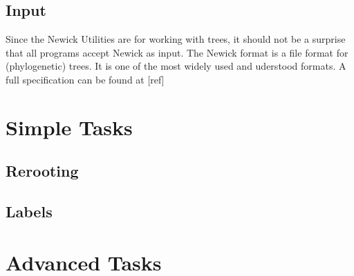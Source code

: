 \documentclass[a4paper,10pt]{report}
\newcommand{\nutils}{Newick Utilities}
\begin{document}
\section{Input}
\label{sect_input}

Since the \nutils{} are for working with trees, it should not be a surprise that all programs accept Newick as input. The Newick format is a file format for (phylogenetic) trees. It is one of the most widely used and uderstood formats.
A full specification can be found at [ref]

\chapter{Simple Tasks}
\label{chap_simple}

\section{Rerooting}

\section{Labels}

\chapter{Advanced Tasks}
\label{chap_adv}
\end{document}
